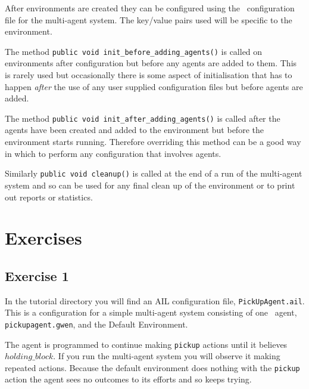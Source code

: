 After environments are created they can be configured using the \ail\ configuration file for the multi-agent system.  The key/value pairs used will be specific to the environment.

The method \texttt{public void init\_before\_adding\_agents()} is called on environments after configuration but before any agents are added to them.  This is rarely used but occasionally there is some aspect of initialisation that has to happen \emph{after} the use of any user supplied configuration files but before agents are added.

The method \texttt{public void init\_after\_adding\_agents()} is called after the agents have been created and added to the environment but before the environment starts running.  Therefore overriding this method can be a good way in which to perform any configuration that involves agents.

Similarly \texttt{public void cleanup()} is called at the end of a run of the multi-agent system and so can be used for any final clean up of the environment or to print out reports or statistics.

\section{Exercises}

\subsection{Exercise 1}
\begin{sloppypar}
In the tutorial directory you will find an AIL configuration file, \texttt{PickUpAgent.ail}.  This is a configuration for a simple multi-agent system consisting of one \gwendolen\ agent, \texttt{pickupagent.gwen}, and the Default Environment.
\end{sloppypar}

The agent is programmed to continue making \texttt{pickup} actions  until it believes $holding\_block$.  If you run the multi-agent system you will observe it making repeated actions.  Because the default environment does nothing with the \texttt{pickup} action the agent sees no outcomes to its efforts and so keeps trying.

